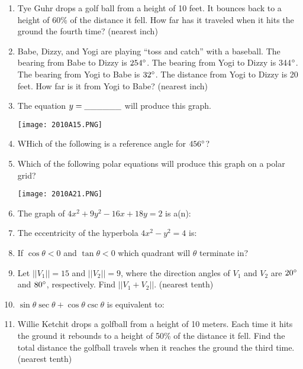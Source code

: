 \documentclass[../uilmath.tex]{subfiles}
\begin{document}
\begin{enumerate}[label=\bfseries\arabic*.]
    \item %
    Tye Guhr drops a golf ball from a height of 10 feet. It bounces back to a height of 60\% of the distance it fell.
    How far has it traveled when it hits the ground the fourth time? (nearest inch)
    
    \item %
    Babe, Dizzy, and Yogi are playing ``toss and catch'' with a baseball. The bearing from Babe to Dizzy is 
    $254\degree$. The bearing from Yogi to Dizzy is 344$\degree$. The bearing from Yogi to Babe is $32\degree$. 
    The distance from Yogi to Dizzy is 20 feet. How far is it from Yogi to Babe? (nearest inch)

    \item %
    The equation $y=\_\_\_\_\_\_$ will produce this graph.
    \begin{center}
        \texttt{[image: 2010A15.PNG]}
    \end{center}

    \item %
    WHich of the following is a reference angle for $456\degree$?

    \item %
    Which of the following polar equations will produce this graph on a polar grid?
    \begin{center}
        \texttt{[image: 2010A21.PNG]}
    \end{center}

    \item %
    The graph of $4x^2+9y^2-16x+18y=2$ is a(n):

    \item %
    The eccentricity of the hyperbola $4x^2-y^2=4$ is:

    \item %
    If $\cos\theta < 0$ and $\tan\theta<0$ which quadrant will $\theta$ terminate in?

    \item %
    Let $||V_1||=15$ and $||V_2||=9$, where the direction angles of $V_1$ and $V_2$ are $20\degree$ and $80\degree$, respectively. Find $||V_1+V_2||$. (nearest tenth)

    \item %
    $\sin\theta \sec\theta + \cos\theta\csc\theta$ is equivalent to:

    \item %
    Willie Ketchit drops a golfball from a height of 10 meters. Each time it hits the ground it rebounds to a height of 50\% of the distance it fell.
    Find the total distance the golfball travels when it reaches the ground the third time. (nearest tenth)


\end{enumerate}
\end{document}
